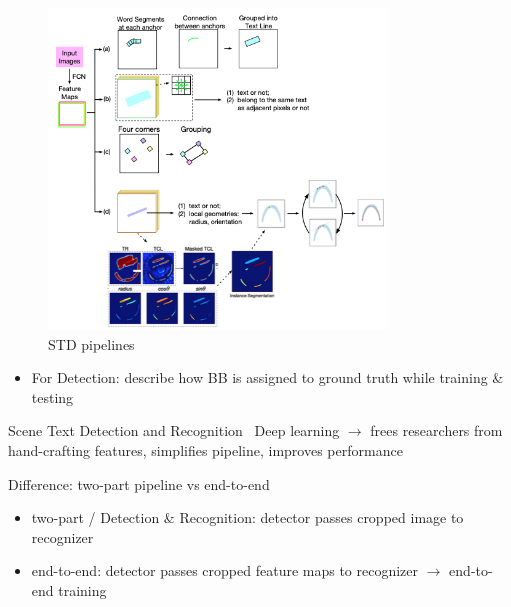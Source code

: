 \begin{figure}[h]
    \centering
    \includegraphics[width=0.80\textwidth]{img/Long-Scene-2021-STD-Pipelines.png}
    \caption{STD pipelines~\citep{long_scene_2021}\label{fig:STD-pipelines}}
\end{figure}

\begin{itemize}
    \item For Detection: describe how BB is assigned to ground truth while training \& testing
\end{itemize}

Scene Text Detection and Recognition~\cite{long_scene_2021}
Deep learning $\rightarrow$ frees researchers from hand-crafting features, simplifies pipeline,
    improves performance

Difference: two-part pipeline vs end-to-end
\begin{itemize}
    \item two-part / Detection \& Recognition: detector passes cropped image to recognizer
    \item end-to-end: detector passes cropped feature maps to recognizer $\rightarrow$ end-to-end
            training
\end{itemize}


